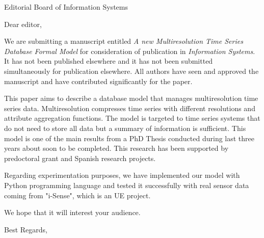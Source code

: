 \documentclass[
fromphone,fromemail,fromalign=right,
backaddress=false,
foldmarks=false,
]{scrlttr2}
\begin{document}


\renewcommand*{\raggedsignature}{\raggedright}

 \begin{letter}{Editorial Board of Information Systems}


   \opening{Dear editor,}

We are submitting a manuscript entitled \emph{A new Multiresolution Time
Series Database Formal Model} for consideration of publication in
\emph{Information Systems}. It has not been published elsewhere and it has
not been submitted simultaneously for publication elsewhere.  All
authors have seen and approved the manuscript and have contributed
significantly for the paper.

This paper aims to describe a database model that manages
multiresolution time series data. Multiresolution compresses time
series with different resolutions and attribute aggregation functions.
The model is targeted to time series systems that do not need to store
all data but a summary of information is sufficient.  This model is one
of the main results from a PhD Thesis conducted during last three
years about soon to be completed. This research has been supported by
predoctoral grant and Spanish research projects.


Regarding experimentation purposes, we have implemented our model with
Python programming language and tested it successfully with real sensor
data coming from "i-Sense", which is an UE project.



   We hope that it will interest your audience.

   \closing{Best Regards,}

 \end{letter}
\end{document}
